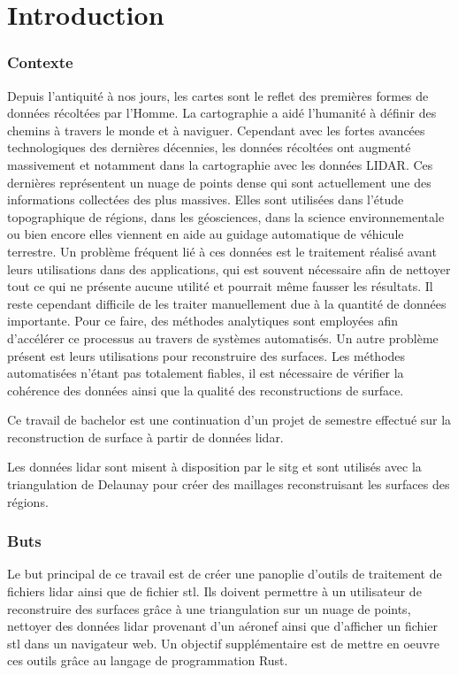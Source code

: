 \chapter*{Introduction}
\subsection*{Contexte}
Depuis l'antiquité à nos jours, les cartes sont le reflet des premières formes de données récoltées par l'Homme.
La cartographie a aidé l'humanité à définir des chemins à travers le monde et à naviguer.
Cependant avec les fortes avancées technologiques des dernières décennies,
les données récoltées ont augmenté massivement et notamment dans la cartographie avec les données LIDAR.
Ces dernières représentent un nuage de points dense qui sont actuellement une des informations collectées des plus massives.
Elles sont utilisées dans l'étude topographique de régions, dans les géosciences,
dans la science environnementale ou bien encore elles viennent en aide au guidage automatique de véhicule terrestre.
Un problème fréquent lié à ces données est le traitement réalisé avant leurs
utilisations dans des applications, qui est souvent nécessaire afin de nettoyer
tout ce qui ne présente aucune utilité et pourrait même fausser les résultats.
Il reste cependant difficile de les traiter manuellement due à la quantité de données importante.
Pour ce faire, des méthodes analytiques sont employées afin d'accélérer ce processus au travers de systèmes automatisés.
Un autre problème présent est leurs utilisations pour reconstruire des surfaces.
Les méthodes automatisées n'étant pas totalement fiables, il est nécessaire de
vérifier la cohérence des données ainsi que la qualité des reconstructions de
surface.

Ce travail de bachelor est une continuation d'un projet de semestre effectué sur
la reconstruction de surface à partir de données lidar.

Les données lidar sont misent à disposition par le \gls{sitg} et sont utilisés
avec la triangulation de Delaunay pour créer des maillages reconstruisant les
surfaces des régions.

\subsection*{Buts}
Le but principal de ce travail est de créer une panoplie d'outils de traitement
de fichiers lidar ainsi que de fichier stl. Ils doivent permettre à un
utilisateur de reconstruire des surfaces grâce à une triangulation sur un nuage
de points, nettoyer des données lidar provenant d'un aéronef ainsi que
d'afficher un fichier stl dans un navigateur web. Un objectif supplémentaire est
de mettre en oeuvre ces outils grâce au langage de programmation Rust.

